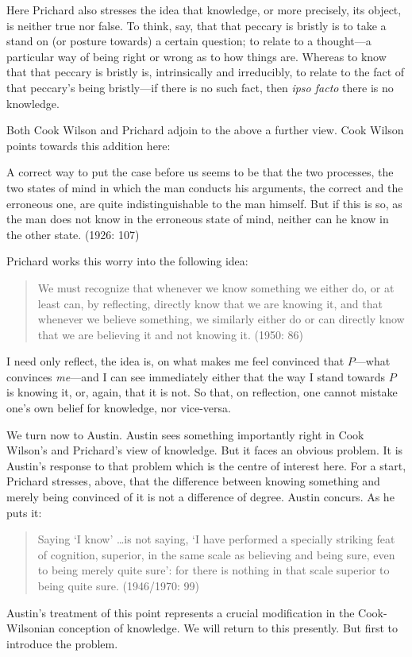 Here Prichard also stresses the idea that knowledge, or more precisely, its object, is neither true nor false. To think, say, that that peccary is bristly is to take a stand on (or posture towards) a certain question; to relate to a thought---a particular way of being right or wrong as to how things are. Whereas to know that that peccary is bristly is, intrinsically and irreducibly, to relate to the fact of that peccary’s being bristly---if there is no such fact, then \emph{ipso facto} there is no knowledge.

Both Cook Wilson and Prichard adjoin to the above a further view. Cook Wilson points towards this addition here:

A correct way to put the case before us seems to be that the two processes, the two states of mind in which the man conducts his arguments, the correct and the erroneous one, are quite indistinguishable to the man himself. But if this is so, as the man does not know in the erroneous state of mind, neither can he know in the other state. (1926: 107)

Prichard works this worry into the following idea:
\begin{quote}
	We must recognize that whenever we know something we either do, or at least can, by reflecting, directly know that we are knowing it, and that whenever we believe something, we similarly either do or can directly know that we are believing it and not knowing it. (1950: 86)
\end{quote}
I need only reflect, the idea is, on what makes me feel convinced that \( P \)---what convinces \emph{me}---and I can see immediately either that the way I stand towards \( P \) is knowing it, or, again, that it is not. So that, on reflection, one cannot mistake one’s own belief for knowledge, nor vice-versa.

We turn now to Austin. Austin sees something importantly right in Cook Wilson’s and Prichard’s view of knowledge. But it faces an obvious problem. It is Austin’s response to that problem which is the centre of interest here. For a start, Prichard stresses, above, that the difference between knowing something and merely being convinced of it is not a difference of degree. Austin concurs. As he puts it:
\begin{quote}
	Saying `I know' \ldots is not saying, `I have performed a specially striking feat of cognition, superior, in the same scale as believing and being sure, even to being merely quite sure': for there is nothing in that scale superior to being quite sure. (1946/1970: 99)
\end{quote}
Austin’s treatment of this point represents a crucial modification in the Cook-Wilsonian conception of knowledge. We will return to this presently. But first to introduce the problem.

